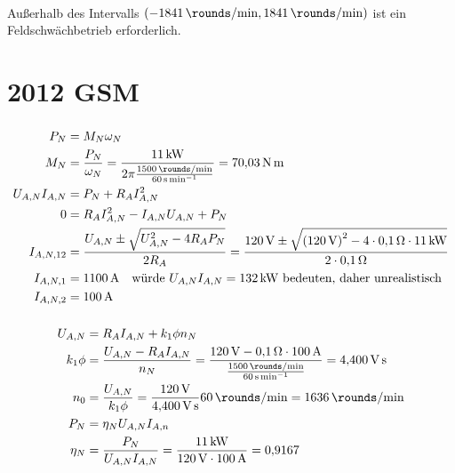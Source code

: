 \documentclass[11pt,a4paper]{scrartcl}
\newcommand{\mybr}[1]{\left(#1\right)}
\newcommand{\0}{_{\mybr{0}}}
\newcommand{\1}{_{\mybr{1}}}
\newcommand{\2}{_{\mybr{2}}}
\begin{document}
\subsection{}
Außerhalb des Intervalls $\mybr{\SI{-1841}{\rounds\per\minute},\SI{1841}{\rounds\per\minute}}$ ist ein Feldschwächbetrieb erforderlich.

\clearpage
\part{2012 GSM}
\section{}
\begin{align}
P_N&=M_N\omega_N\\
M_N&=\frac{P_N}{\omega_N}=\frac{\SI{11}{\kilo\watt}}{2\pi\frac{\SI{1500}{\rounds\per\minute}}{\SI{60}{\second\per\minute}}}=\SI{70.03}{\newton\metre}\\
U_{A,N}I_{A,N}&=P_N+R_A I_{A,N}^2\\
0&=R_A I_{A,N}^2-I_{A,N}U_{A,N}+P_N\\
I_{A,N,12}&=\frac{U_{A,N}\pm\sqrt{U_{A,N}^2-4R_A P_N}}{2 R_A}=\frac{\SI{120}{\volt}\pm\sqrt{\mybr{\SI{120}{\volt}}^2-4\cdot\SI{0.1}{\ohm}\cdot\SI{11}{\kilo\watt}}}{2\cdot\SI{0.1}{\ohm}}\\
I_{A,N,1}&=\SI{1100}{\ampere}\quad\text{würde $U_{A,N}I_{A,N}=\SI{132}{\kilo\watt}$ bedeuten, daher unrealistisch}\\
I_{A,N,2}&=\SI{100}{\ampere}\\
\end{align}

\section{}
\begin{align}
U_{A,N}&=R_A I_{A,N}+k_1\phi n_N\\
k_1\phi&=\frac{U_{A,N}-R_A I_{A,N}}{n_N}=\frac{\SI{120}{\volt}-\SI{0.1}{\ohm}\cdot\SI{100}{\ampere}}{\frac{\SI{1500}{\rounds\per\minute}}{\SI{60}{\second\per\minute}}}=\SI{4.400}{\volt\second}\\
n_0&=\frac{U_{A,N}}{k_1\phi}=\frac{\SI{120}{\volt}}{\SI{4.400}{\volt\second}}\SI{60}{\rounds\per\minute}=\SI{1636}{\rounds\per\minute}\\
P_N&=\eta_N U_{A,N} I_{A,n}\\
\eta_N&=\frac{P_N}{U_{A,N}I_{A,N}}=\frac{\SI{11}{\kilo\watt}}{\SI{120}{\volt}\cdot\SI{100}{\ampere}}=\num{0.9167}
\end{align}
\end{document}
